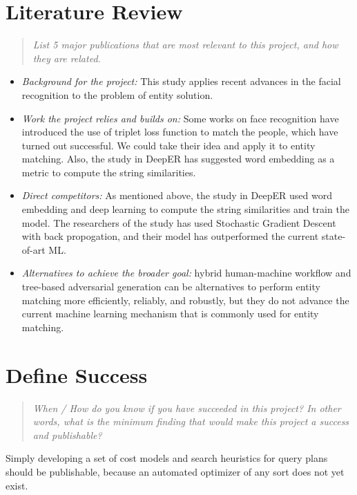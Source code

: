 \documentclass{proc}
\begin{document}
\section{Literature Review}
\begin{quote}
\emph{List 5 major publications that are most relevant to this project, and how they are related.}
\end{quote}

\begin{itemize}
\item \emph{Background for the project:} This study applies recent advances in the facial recognition to the problem of entity solution.

\item \emph{Work the project relies and builds on: } Some works on face recognition have introduced the use of triplet loss function to match the people, which have turned out  successful. We could take their idea and apply it to entity matching. Also, the study in DeepER has suggested word embedding as a metric to compute the string similarities.

\item \emph{Direct competitors: } As mentioned above, the study in DeepER used word embedding and deep learning to compute the string similarities and train the model. The researchers of the study has used Stochastic Gradient Descent with back propogation, and their model has outperformed the current state-of-art ML.

\item \emph{Alternatives to achieve the broader goal: } hybrid human-machine workflow and tree-based adversarial generation can be alternatives to perform entity matching more efficiently, reliably, and robustly, but they do not advance the current machine learning mechanism that is commonly used for entity matching.

 \end{itemize}


\section{Define Success}
\begin{quote}
\emph{When / How do you know if you have succeeded in this project?
In other words, what is the minimum finding that would make this project a success and publishable?}
\end{quote}

Simply developing a set of cost models and search heuristics for query plans should be publishable, because an automated optimizer of any sort does not yet exist.  



\end{document}
